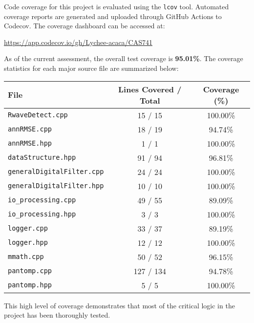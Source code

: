 \documentclass[12pt, titlepage]{article}
\begin{document}
Code coverage for this project is evaluated using the \texttt{lcov} tool.
Automated coverage reports are generated and uploaded through GitHub Actions to
Codecov. The coverage dashboard can be accessed at:

\begin{center}
\url{https://app.codecov.io/gh/Lychee-acaca/CAS741}
\end{center}

As of the current assessment, the overall test coverage is \textbf{95.01\%}. The
coverage statistics for each major source file are summarized below:

\begin{center}
\begin{tabular}{|l|c|c|}
\hline
\textbf{File} & \textbf{Lines Covered / Total} & \textbf{Coverage (\%)} \\
\hline
\texttt{RwaveDetect.cpp}         & 15 / 15    & 100.00\% \\
\texttt{annRMSE.cpp}             & 18 / 19    & 94.74\%  \\
\texttt{annRMSE.hpp}             & 1 / 1      & 100.00\% \\
\texttt{dataStructure.hpp}       & 91 / 94    & 96.81\%  \\
\texttt{generalDigitalFilter.cpp}& 24 / 24    & 100.00\% \\
\texttt{generalDigitalFilter.hpp}& 10 / 10    & 100.00\% \\
\texttt{io\_processing.cpp}       & 49 / 55    & 89.09\%  \\
\texttt{io\_processing.hpp}       & 3 / 3      & 100.00\% \\
\texttt{logger.cpp}              & 33 / 37    & 89.19\%  \\
\texttt{logger.hpp}              & 12 / 12    & 100.00\% \\
\texttt{mmath.cpp}               & 50 / 52    & 96.15\%  \\
\texttt{pantomp.cpp}             & 127 / 134  & 94.78\%  \\
\texttt{pantomp.hpp}             & 5 / 5      & 100.00\% \\
\hline
\end{tabular}
\end{center}

This high level of coverage demonstrates that most of the critical logic in the
project has been thoroughly tested.



\end{document}
